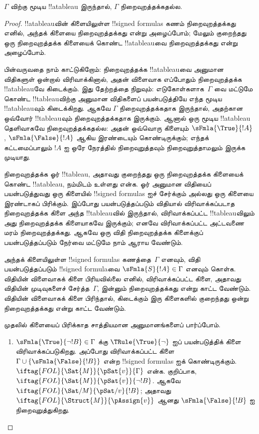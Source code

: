 \documentclass[../../../include/open-logic-section]{subfiles}
\begin{document}
\begin{thm}[சரித்தன்மை]
  $\Gamma$ விற்கு மூடிய !!a{tableau} இருந்தால், $\Gamma$ நிறைவுறத்தக்கதல்ல.
\end{thm}

\begin{proof}
!!a{tableau}வின் கிளையிலுள்ள !!{signed formula}s கணம் நிறைவுறத்தக்கது
எனில், அந்தக் கிளையை நிறைவுறத்தக்கது என்று அழைப்போம்; மேலும் குறைந்தது ஒரு
நிறைவுறத்தக்க கிளையைக் கொண்ட !!a{tableau}வை நிறைவுறத்தக்கது என்று அழைப்போம்.

பின்வருவதை நாம் காட்டுகிறோம்: நிறைவுறத்தக்க !!a{tableau}வை அனுமான
விதிகளுள் ஒன்றால் விரிவாக்கினால், அதன் விளைவாக எப்போதும் நிறைவுறத்தக்க
!!a{tableau}வே கிடைக்கும். இது தேற்றத்தை நிறுவும்: எடுகோள்களாக~$\Gamma$
வை மட்டுமே கொண்ட !!{tableau}விற்கு அனுமான விதிகளைப் பயன்படுத்தியே எந்த
மூடிய !!a{tableau}வும் கிடைக்கிறது. ஆகவே $\Gamma$
நிறைவுறத்தக்கதாக இருந்தால், அதற்கான ஒவ்வோர் !!{tableau}வும்
நிறைவுறத்தக்கதாக இருக்கும். ஆனால் ஒரு மூடிய !!a{tableau} தெளிவாகவே
நிறைவுறத்தக்கதல்ல: அதன் ஒவ்வொரு கிளையும் $\sFmla{\True}{!A}$,
$\sFmla{\False}{!A}$ ஆகிய இரண்டையும் கொண்டிருக்கும்; எந்தக் கட்டமைப்பாலும்
$!A$ ஐ ஒரே நேரத்தில் நிறைவுறுத்தவும் நிறைவுறுத்தாமலும் இருக்க முடியாது.

நிறைவுறத்தக்க ஓர் !!{tableau}, அதாவது குறைந்தது ஒரு நிறைவுறத்தக்க கிளையைக்
கொண்ட !!a{tableau}, நம்மிடம் உள்ளது என்க. ஓர் அனுமான விதியைப் பயன்படுத்துவது
ஒரு கிளையில் !!{signed formula}s ஐச் சேர்க்கும் அல்லது ஒரு கிளையை இரண்டாகப்
பிரிக்கும். இப்போது பயன்படுத்தப்படும் விதியால் விரிவாக்கப்படாத நிறைவுறத்தக்க
கிளை அந்த !!{tableau}வில் இருந்தால், விரிவாக்கப்பட்ட !!{tableau}விலும் அது
நிறைவுறத்தக்க கிளையாகவே இருக்கும்; எனவே விரிவாக்கப்பட்ட அட்டவணை மரம்
நிறைவுறத்தக்கது. ஆகவே ஒரு விதி நிறைவுறத்தக்க கிளைக்குப் பயன்படுத்தப்படும்
நேர்வை மட்டுமே நாம் ஆராய வேண்டும்.

அந்தக் கிளையிலுள்ள !!{signed formula}s கணத்தை~$\Gamma$ எனவும், விதி
பயன்படுத்தப்படும் !!{signed formula}வை $\sFmla{S}{!A} \in \Gamma$ எனவும்
கொள்க. விதியின் விளைவாகக் கிளை பிரியவில்லை எனில், விரிவாக்கப்பட்ட கிளை,
அதாவது விதியின் முடிவுகளைச் சேர்த்த~$\Gamma$, இன்னும் நிறைவுறத்தக்கது என்று
காட்ட வேண்டும். விதியின் விளைவாகக் கிளை பிரிந்தால், கிடைக்கும் இரு கிளைகளில்
குறைந்தது ஒன்று நிறைவுறத்தக்கது என்று காட்ட வேண்டும்.
  
முதலில் கிளையைப் பிரிக்காத சாத்தியமான அனுமானங்களைப் பார்ப்போம்.
\begin{enumerate}
\item $\sFmla{\True}{\lnot !B} \in \Gamma$ க்கு
  $\TRule{\True}{\lnot}$ ஐப் பயன்படுத்திக் கிளை விரிவாக்கப்படுகிறது.
  அப்போது விரிவாக்கப்பட்ட கிளை $\Gamma \cup
  \{\sFmla{\False}{!B}\}$ என்ற !!{signed formula}s ஐக் கொண்டிருக்கும்.
  $\iftag{FOL}{\Sat{M}}{\pSat{v}}{\Gamma}$ என்க. குறிப்பாக,
  $\iftag{FOL}{\Sat{M}}{\pSat{v}}{\lnot !B}$. ஆகவே
  $\iftag{FOL}{\Sat/{M}}{\pSat/{v}}{!B}$; அதாவது
  $\iftag{FOL}{\Struct{M}}{\pAssign{v}}$ ஆனது
  $\sFmla{\False}{!B}$ ஐ நிறைவுறுத்துகிறது.


\end{enumerate}
\end{proof}
\end{document}
